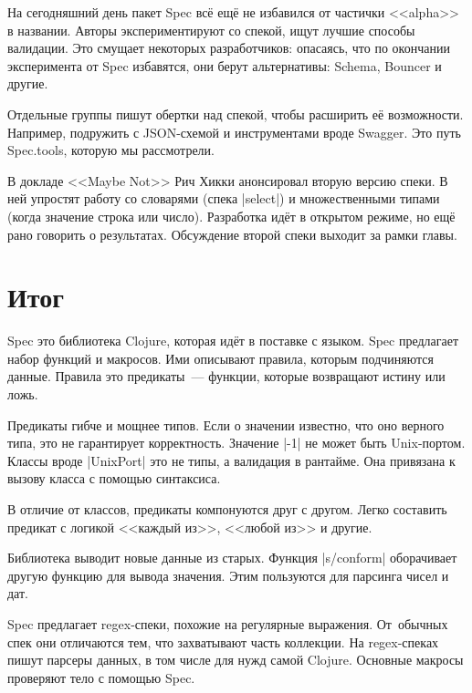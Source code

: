 На сегодняшний день пакет Spec вс\"{е} ещ\"{е} не избавился от частички <<alpha>> в
названии. Авторы экспериментируют со спекой, ищут лучшие способы валидации. Это
смущает некоторых разработчиков: опасаясь, что по окончании эксперимента от Spec
избавятся, они берут альтернативы:
Schema,
Bouncer и другие.

Отдельные группы пишут обертки над спекой, чтобы расширить е\"{е}
возможности. Например, подружить с JSON-схемой и инструментами вроде
Swagger. Это путь Spec.tools, которую мы рассмотрели.


В докладе <<Maybe Not>> Рич
Хикки анонсировал вторую версию спеки. В ней упростят работу со словарями (спека
\spverb|select|) и множественными типами (когда значение строка или
число). Разработка ид\"{е}т в открытом режиме, но ещ\"{е} рано говорить о
результатах. Обсуждение второй спеки выходит за рамки главы.

\section{Итог}

Spec это библиотека Clojure, которая ид\"{е}т в поставке с языком. Spec предлагает
набор функций и макросов. Ими описывают правила, которым подчиняются
данные. Правила это предикаты~--- функции, которые возвращают истину или ложь.

Предикаты гибче и мощнее типов. Если о значении известно, что оно верного типа,
это не гарантирует корректность. Значение \spverb|-1| не может быть
Unix-портом. Классы вроде \spverb|UnixPort| это не типы, а валидация в
рантайме. Она привязана к вызову класса с помощью синтаксиса.

В отличие от классов, предикаты компонуются друг с другом. Легко составить
предикат с логикой <<каждый из>>, <<любой из>> и другие.

Библиотека выводит новые данные из старых. Функция \spverb|s/conform|
оборачивает другую функцию для вывода значения. Этим пользуются для парсинга
чисел и дат.

Spec предлагает regex-спеки, похожие на регулярные выражения. От~обычных спек
они отличаются тем, что захватывают часть коллекции. На regex-спеках пишут
парсеры данных, в том числе для нужд самой Clojure. Основные макросы проверяют
тело с помощью Spec.

